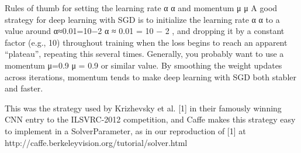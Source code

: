 \documentclass[a4paper, 12pt]{article}
\numberwithin{equation}{section}
\begin{document}
	Rules of thumb for setting the learning rate α
	α
	and momentum μ
	μ
	A good strategy for deep learning with SGD is to initialize the learning rate α
	α
	to a value around α≈0.01=10−2
	α
	≈
	0.01
	=
	10
	−
	2
	, and dropping it by a constant factor (e.g., 10) throughout training when the loss begins to reach an apparent “plateau”, repeating this several times. Generally, you probably want to use a momentum μ=0.9
	μ
	=
	0.9
	or similar value. By smoothing the weight updates across iterations, momentum tends to make deep learning with SGD both stabler and faster.
	
	This was the strategy used by Krizhevsky et al. [1] in their famously winning CNN entry to the ILSVRC-2012 competition, and Caffe makes this strategy easy to implement in a SolverParameter, as in our reproduction of [1] at 
	http://caffe.berkeleyvision.org/tutorial/solver.html
	
	\newpage
	
	\clearpage
	
	\newpage
	\pagestyle{plain}
	
	
	
	
\end{document}
